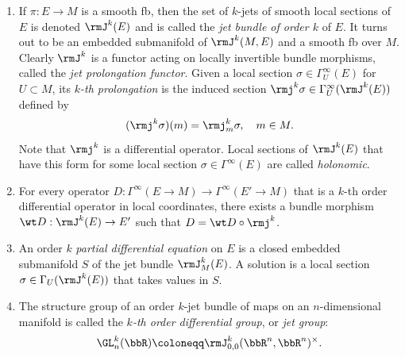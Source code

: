 \begin{defn}
\begin{enumerate}
        On the sets of all $k$-jets $\rmJ^k(M,M')=\bigsqcup_{m\in M}\rmJ^k_m(M,M')$ we can define natural projections
        \begin{align}
            \pi^k_l:\rmJ^k(M,M')\to \rmJ^l(M,M'),&\quad  \rmj_m^l f\mapsto m, 0\leq l<k,\\
            \pi^k_0:\rmJ^k(M,M')\to M\times M',&\quad \rmj_m^k f\mapsto (m,f(m)).
        \end{align}
        The projections $\pi^k_0$ induce a unique smooth structure on $\rmJ^k(M,M')$ that turns both of the projections into smooth \glspl{fb}. The map $\pi^k_0$ is called the \emph{$k$-th jet bundle} of maps from $M$ to $M'$.
        We set
        \[\rmJ^k_{m}(M,M')_{m'}\coloneqq (\pi^k_0)^{-1}((m,m')).\]
        If $\dim M=n$ and $\dim N=n'$, then the typical fiber of the jet bundle is the manifold $\rmJ^k_{0}(\bbR^n,\bbR^{n'})_0$, which parametrizes the values of Taylor coefficients (above the $0$-th order) of maps in a local chart.
        \item If $\pi:E\to M$ is a smooth \gls{fb}, then the set of $k$-jets of smooth local sections of $E$ is denoted $\rmJ^k(E)$ and is called the \emph{jet bundle of order $k$} of $E$. It turns out to be an embedded submanifold of $\rmJ^k(M,E)$ and a smooth \gls{fb} over $M$. Clearly $\rmJ^k$ is a functor acting on locally invertible bundle morphisms, called the \emph{jet prolongation functor}. Given a local section $\sigma\in \Gamma_U^\infty(E)$ for $U\subset M$, its \emph{$k$-th prolongation} is the induced section $\rmj^k\sigma\in\Gamma_U^\infty(\rmJ^k(E))$ defined by
        \[(\rmj^k\sigma)(m)=\rmj^k_m\sigma,\quad m\in M.\]
        Note that $\rmj^k$ is a differential operator. Local sections of $\rmJ^k(E)$ that have this form for some local section $\sigma\in\Gamma^\infty(E)$ are called \emph{holonomic}.
        \item For every operator $D:\Gamma^\infty(E\to M)\to \Gamma^\infty(E'\to M)$ that is a $k$-th order differential operator in local coordinates, there exists a bundle morphism $\wt D:\rmJ^k(E)\to E'$ such that $D=\wt D\circ \rmj^k$.
        \item An order $k$ \emph{partial differential equation} on $E$ is a closed embedded submanifold $S$ of the jet bundle $\rmJ^k_M(E)$. A solution is a local section $\sigma\in\Gamma_U(\rmJ^k(E))$ that takes values in $S$. 
        \item The structure group of an order $k$-jet bundle of maps on an $n$-dimensional manifold is called the \emph{$k$-th order differential group}, or \emph{jet group}: 
        \[\GL^k_n(\bbR)\coloneqq \rmJ^k_{0,0}(\bbR^n,\bbR^n)^\times.\]
    \end{enumerate}
\end{defn}


